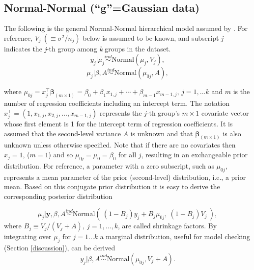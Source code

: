 \documentclass[article]{jss}
\begin{document}
\subsection[Normal-Normal]{Normal-Normal (``g''=Gaussian data)}
The following is the general Normal-Normal hierarchical model assumed by . For reference,  $V_{j}~(\equiv \sigma^{2}/n_{j})$ below is assumed to be known, and subscript \emph{j} indicates the \emph{j}-th group among \emph{k} groups in the dataset.
\begin{equation}\label{normalobs}
y_{j}\vert \mu_{j} \stackrel{ind}{\sim}\textrm{Normal}(\mu_{j}, V_{j}),
\end{equation}
\begin{equation}\label{normalprior}
\mu_{j}\vert \beta, A\stackrel{ind}{\sim}\textrm{Normal}(\mu_{0j}, A),
\end{equation}

where $\mu_{0j} = x_{j}^\top \mathbf{\beta}_{(m\times1)}=\beta_{0}+\beta_{1}x_{1, j} + \cdots + \beta_{m-1}x_{m-1, j}$, $j=1, \ldots k$ and $m$ is the number of regression coefficients including an intercept term. The notation $x_{j}^\top=(1, x_{1, j}, x_{2, j}, \ldots, x_{m-1, j})$ represents the $j$-th group's $m\times 1$ covariate vector whose first element is 1 for the intercept term of regression coefficients. It is assumed that the second-level variance $A$ is unknown and that $\mathbf{\beta}_{(m\times1)}$ is also unknown unless otherwise specified. Note that if there are no covariates then $x_{j}=1$, ($m=1$) and so $\mu_{0j}=\mu_{0}=\beta_{0}$ for all $j$, resulting in an exchangeable prior distribution. For reference, a parameter with a zero subscript, such as $\mu_{0j}$, represents a mean parameter of the prior (second-level) distribution, i.e., a prior mean. Based on this conjugate prior distribution it is easy to derive the corresponding posterior distribution



\begin{equation} \label{normalpost}
\mu_{j}\vert \textbf{y}, \beta, A \stackrel{ind}{\sim}\textrm{Normal}(~(1-B_{j})y_{j} + B_{j}\mu_{0j},~(1-B_{j})V_{j}~),
\end{equation}
where $B_{j}\equiv V_{j}/(V_{j} + A),~j=1, \ldots, k$, are called shrinkage factors. By integrating over $\mu_{j}$ for $j = 1 \ldots k$ a marginal distribution, useful for model checking (Section \ref{discussion}), can be derived
\begin{equation} \label{normalmarginal}
y_{j}\vert \beta, A \stackrel{ind}{\sim}\textrm{Normal}(\mu_{0j}, V_{j} + A). 
\end{equation}
\end{document}
